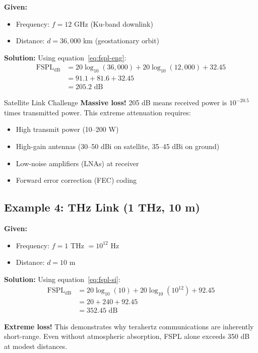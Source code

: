 \textbf{Given:}
\begin{itemize}
\item Frequency: $f = 12$ GHz (Ku-band downlink)
\item Distance: $d = 36{,}000$ km (geostationary orbit)
\end{itemize}

\textbf{Solution:} Using equation~\eqref{eq:fspl-eng}:
\begin{align}
\text{FSPL}_{\text{dB}} &= 20\log_{10}(36{,}000) + 20\log_{10}(12{,}000) + 32.45 \nonumber \\
&= 91.1 + 81.6 + 32.45 \nonumber \\
&= 205.2 \text{ dB}
\end{align}

\begin{calloutbox}{Satellite Link Challenge}
\textbf{Massive loss!} 205 dB means received power is $10^{-20.5}$ times transmitted power. This extreme attenuation requires:
\begin{itemize}
\item High transmit power (10--200 W)
\item High-gain antennas (30--50 dBi on satellite, 35--45 dBi on ground)
\item Low-noise amplifiers (LNAs) at receiver
\item Forward error correction (FEC) coding
\end{itemize}
\end{calloutbox}

\subsection{Example 4: THz Link (1 THz, 10 m)}

\textbf{Given:}
\begin{itemize}
\item Frequency: $f = 1$ THz $= 10^{12}$ Hz
\item Distance: $d = 10$ m
\end{itemize}

\textbf{Solution:} Using equation~\eqref{eq:fspl-si}:
\begin{align}
\text{FSPL}_{\text{dB}} &= 20\log_{10}(10) + 20\log_{10}(10^{12}) + 92.45 \nonumber \\
&= 20 + 240 + 92.45 \nonumber \\
&= 352.45 \text{ dB}
\end{align}

\textbf{Extreme loss!} This demonstrates why terahertz communications are inherently short-range. Even without atmospheric absorption, FSPL alone exceeds 350 dB at modest distances.

